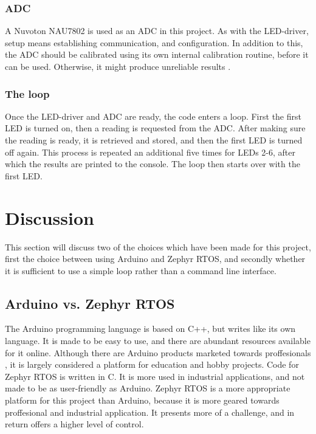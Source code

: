 \documentclass[12pt, a4paper]{article}
\begin{document}
            \subsubsection{ADC}
                A Nuvoton NAU7802 is used as an ADC in this project. As with the LED-driver, setup means establishing communication, and configuration.
                In addition to this, the ADC should be calibrated using its own internal calibration routine, before it can be used. Otherwise, it
                might produce unreliable results \cite{nau}.

            \subsubsection{The loop}
                Once the LED-driver and ADC are ready, the code enters a loop. First the first LED is turned on, then a reading is requested from the ADC. After
                making sure the reading is ready, it is retrieved and stored, and then the first LED is turned off again. This process is repeated
                an additional five times for LEDs 2-6, after which the results are printed to the console. The loop then starts over with the first LED.

        \section{Discussion}

            This section will discuss two of the choices which have been made for this project, first the choice between using Arduino and Zephyr RTOS,
            and secondly whether it is sufficient to use a simple loop rather than a command line interface.
            
            \subsection{Arduino vs. Zephyr RTOS}
                The Arduino programming language is based on C++, but writes like its own language. It is made to be easy to use, and there are abundant resources available for it online.
                Although there are Arduino products marketed towards proffesionals \cite{arduinopro}, it is largely considered a platform for
                education and hobby projects.
                Code for Zephyr RTOS is written in C. It is more used in industrial applications, and not made to be as user-friendly as Arduino. Zephyr RTOS is a more
                appropriate platform for this project than Arduino, because it is more geared towards proffesional and industrial application.
                It presents more of a challenge, and in return offers a higher level of control.
\end{document}

